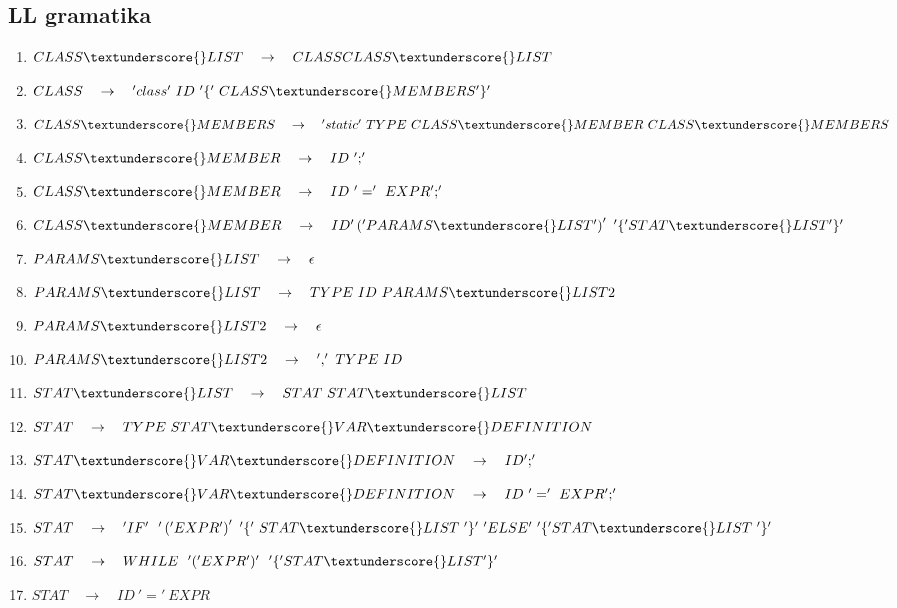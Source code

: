 \documentclass[12pt, a4paper]{article}
\begin{document}
        \subsection{LL gramatika}
	        \begin{enumerate}
				\item \( CLASS\textunderscore{}LIST\quad{}\rightarrow\quad{}CLASS CLASS\textunderscore{}LIST \)
				\item \( CLASS\quad{}\rightarrow\quad{}'class'\ ID\ '\{'\ CLASS\textunderscore{}MEMBERS '\}' \)
				\item \( CLASS\textunderscore{}MEMBERS\quad{}\rightarrow\quad{}'static'\ TYPE\ CLASS\textunderscore{}MEMBER\ CLASS\textunderscore{}MEMBERS \)
				\item \( CLASS\textunderscore{}MEMBER\quad{}\rightarrow\quad{}ID\ ';' \)
				\item \( CLASS\textunderscore{}MEMBER\quad{}\rightarrow\quad{}ID\ '='\ EXPR ';' \)
				\item \( CLASS\textunderscore{}MEMBER\quad{}\rightarrow\quad{}ID '\left(' PARAMS\textunderscore{}LIST '\right)'\ '\{' STAT\textunderscore{}LIST '\}' \)
				\item \( PARAMS\textunderscore{}LIST\quad{}\rightarrow\quad{}\epsilon \)
				\item \( PARAMS\textunderscore{}LIST\quad{}\rightarrow\quad{}TYPE\ ID\ PARAMS\textunderscore{}LIST2 \)
				\item \( PARAMS\textunderscore{}LIST2\quad{}\rightarrow\quad{}\epsilon \)
				\item \( PARAMS\textunderscore{}LIST2\quad{}\rightarrow\quad{}','\ TYPE\ ID \)
				\item \( STAT\textunderscore{}LIST\quad{}\rightarrow\quad{}STAT\ STAT\textunderscore{}LIST \)
				\item \( STAT\quad{}\rightarrow\quad{}TYPE\ STAT\textunderscore{}VAR\textunderscore{}DEFINITION \)
				\item \( STAT\textunderscore{}VAR\textunderscore{}DEFINITION\quad{}\rightarrow\quad{}ID ';' \)
				\item \( STAT\textunderscore{}VAR\textunderscore{}DEFINITION\quad{}\rightarrow\quad{}ID\ '='\ EXPR ';' \)
				\item \( STAT\quad{}\rightarrow\quad{}'IF'\ \ '\left(' EXPR '\right)'\ '\{'\ STAT\textunderscore{}LIST\ '\}'\ 'ELSE'\ '\{'STAT\textunderscore{}LIST\ '\}'\)
				\item \( STAT\quad{}\rightarrow\quad{}WHILE\ \ '(' EXPR ')'\ \ '\{' STAT\textunderscore{}LIST '\}' \)
				\item \( STAT\quad{}\rightarrow\quad{}ID\ '='\ EXPR \)

\end{enumerate}
\end{document}
